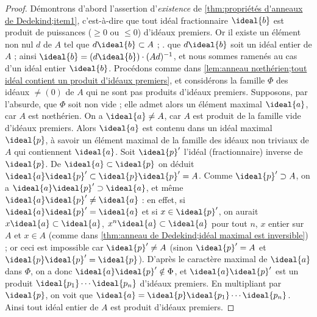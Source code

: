\documentclass[11pt, useosf,
  title in boldface,
  theorem in new line,
  theorem numbering = section,
  number theorems separately,
]{simplivre}
\begin{document}
    \begin{proof}
        Démontrons d'abord l'assertion d'\emph{existence} de \ref{thm:propriétés d'anneaux de Dedekind;item1}, c'est-à-dire que tout idéal fractionnaire \( \ideal{b} \) est produit de puissances (\( \geqslant 0 \) ou \( \leqslant 0 \)) d'idéaux premiers. Or il existe un élément non nul \( d \) de \( A \) tel que \( d \ideal{b} \subset A \) ; \ie. que \( d \ideal{b} \) soit un idéal entier de \( A \) ; ainsi \( \ideal{b} = (d \ideal{b}) \cdot (Ad)^{-1} \), et nous sommes ramenés au cas d'un idéal entier \( \ideal{b} \). Procédons comme dans \cref{lem:anneau nœthérien;tout idéal contient un produit d'idéaux premiers}, et considérons la famille \( \Phi \) des idéaux \( \neq (0) \) de \( A \) qui ne sont pas produits d'idéaux premiers. Supposons, par l'absurde, que \( \Phi \) soit non vide ; elle admet alors un élément maximal \( \ideal{a} \), car \( A \) est nœthérien. On a \( \ideal{a} \neq A \), car \( A \) est produit de la famille vide d'idéaux premiers. Alors \( \ideal{a} \) est contenu dans un idéal maximal \( \ideal{p} \), à savoir un élément maximal de la famille des idéaux non triviaux de \( A \) qui contiennent \( \ideal{a} \). Soit \( \ideal{p}' \) l'idéal (fractionnaire) inverse de \( \ideal{p} \). De \( \ideal{a} \subset \ideal{p} \) on déduit \( \ideal{a} \ideal{p}' \subset \ideal{p}\ideal{p}' = A \). Comme \( \ideal{p}' \supset A \), on a \( \ideal{a} \ideal{p}' \supset \ideal{a} \), et même \( \ideal{a}\ideal{p}' \neq \ideal{a} \) : en effet, si \( \ideal{a} \ideal{p}' = \ideal{a} \) et si \( x \in \ideal{p}' \), on aurait \( x\ideal{a} \subset \ideal{a} \), \( x^n\ideal{a} \subset \ideal{a} \) pour tout \( n \), \( x \) entier sur \( A \) et \( x \in A \) (comme dans \cref{thm:anneau de Dedekind;idéal maximal est inversible}) ; or ceci est impossible car \( \ideal{p}' \neq A \) (sinon \( \ideal{p}' = A \) et \( \ideal{p}\ideal{p}' = \ideal{p} \)). D'après le caractère maximal de \( \ideal{a} \) dans \( \Phi \), on a donc \( \ideal{a}\ideal{p}' \notin \Phi \), et \( \ideal{a}\ideal{p}' \) est un produit \( \ideal{p_1} \cdots \ideal{p_n} \) d'idéaux premiers. En multipliant par \( \ideal{p} \), on voit que \( \ideal{a} = \ideal{p} \ideal{p_1} \cdots \ideal{p_n} \). Ainsi tout idéal entier de \( A \) est produit d'idéaux premiers.


\end{proof}
\end{document}
